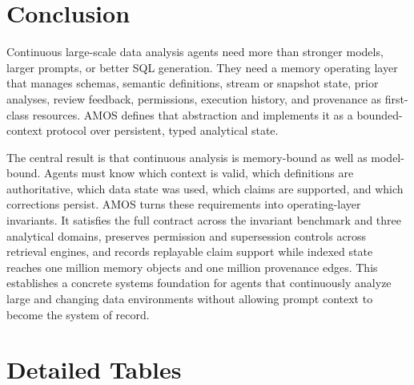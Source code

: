 \documentclass[10pt]{article}
\newcommand{\amos}{\textsc{AMOS}\xspace}
\begin{document}
\section{Conclusion}

Continuous large-scale data analysis agents need more than stronger models, larger prompts, or better SQL generation. They need a memory operating layer that manages schemas, semantic definitions, stream or snapshot state, prior analyses, review feedback, permissions, execution history, and provenance as first-class resources. \amos defines that abstraction and implements it as a bounded-context protocol over persistent, typed analytical state.

The central result is that continuous analysis is memory-bound as well as model-bound. Agents must know which context is valid, which definitions are authoritative, which data state was used, which claims are supported, and which corrections persist. \amos turns these requirements into operating-layer invariants. It satisfies the full contract across the invariant benchmark and three analytical domains, preserves permission and supersession controls across retrieval engines, and records replayable claim support while indexed state reaches one million memory objects and one million provenance edges. This establishes a concrete systems foundation for agents that continuously analyze large and changing data environments without allowing prompt context to become the system of record.

\appendix
\section{Detailed Tables}
\setcounter{table}{0}
\renewcommand{\thetable}{A\arabic{table}}
\renewcommand{\theHtable}{A\arabic{table}}
\end{document}
